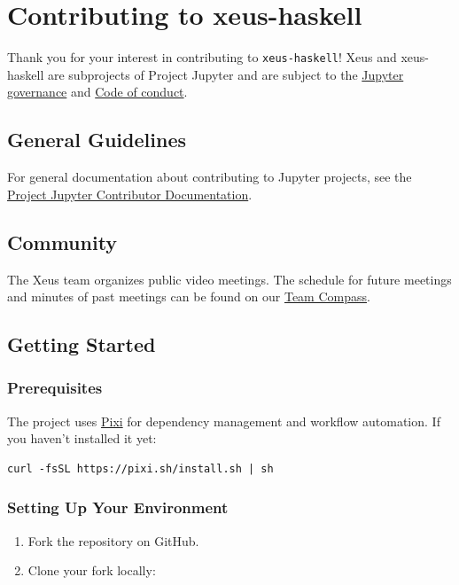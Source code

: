 \documentclass[11pt]{article}
\begin{document}

\section{Contributing to xeus-haskell}
\label{sec:contributing}


Thank you for your interest in contributing to \texttt{xeus-haskell}!
Xeus and xeus-haskell are subprojects of Project Jupyter and are subject to the \href{https://github.com/jupyter/governance}{Jupyter governance} and \href{https://github.com/jupyter/governance/blob/master/conduct/code\_of\_conduct.md}{Code of conduct}.
\subsection{General Guidelines}


For general documentation about contributing to Jupyter projects, see the \href{https://jupyter.readthedocs.io/en/latest/contributor/content-contributor.html}{Project Jupyter Contributor Documentation}.
\subsection{Community}


The Xeus team organizes public video meetings. The schedule for future meetings and minutes of past meetings can be found on our \href{https://jupyter-xeus.github.io/}{Team Compass}.
\subsection{Getting Started}


\subsubsection{Prerequisites}


The project uses \href{https://pixi.sh/}{Pixi} for dependency management and workflow automation. If you haven't installed it yet:
\begin{verbatim}
curl -fsSL https://pixi.sh/install.sh | sh
\end{verbatim}


\subsubsection{Setting Up Your Environment}


\begin{enumerate}
\item Fork the repository on GitHub.
\item Clone your fork locally:
\end{enumerate}
\end{document}
